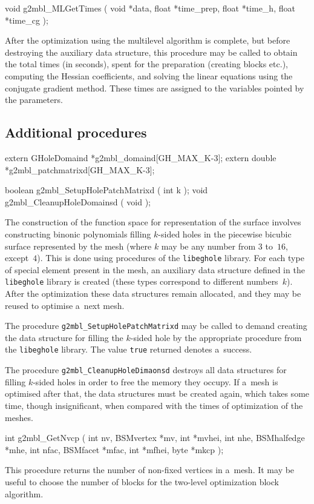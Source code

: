 \medskip
\begin{listingC}
void g2mbl_MLGetTimes ( void *data,
                float *time_prep, float *time_h, float *time_cg );
\end{listingC}
After the optimization using the multilevel algorithm is complete, but
before destroying the auxiliary data structure, this procedure may be called
to obtain the total times (in seconds), spent for the preparation (creating
blocks etc.), computing the Hessian coefficients, and solving the linear
equations using the conjugate gradient method. These times are assigned to
the variables pointed by the parameters.


\subsection{Additional procedures}

\begin{listingC}
extern GHoleDomaind *g2mbl_domaind[GH_MAX_K-3];
extern double *g2mbl_patchmatrixd[GH_MAX_K-3]; 

boolean g2mbl_SetupHolePatchMatrixd ( int k );
void g2mbl_CleanupHoleDomainsd ( void );
\end{listingC}
The construction of the function space for representation of the surface
involves constructing binonic polynomials filling $k$-sided holes in the
piecewise bicubic surface represented by the mesh (where $k$ may be any
number from $3$ to~$16$, except~$4$). This is done using
procedures of the \texttt{libeghole} library. For each type of special
element present in the mesh, an auxiliary data structure defined in the
\texttt{libeghole} library is created (these types correspond to different
numbers~$k$). After the optimization these data structures remain allocated,
and they may be reused to optimise a~next mesh.

The procedure \texttt{g2mbl\_SetupHolePatchMatrixd} may be called to demand
creating the data structure for filling the $k$-sided hole by the
appropriate procedure from the \texttt{libeghole} library.
The value \texttt{true} returned denotes a~success.

The procedure \texttt{g2mbl\_CleanupHoleDimaonsd} destroys all data
structures for filling $k$-sided holes in order to free the memory they
occupy. If a~mesh is optimised after that, the data structures must be
created again, which takes some time, though insignificant, when compared
with the times of optimization of the meshes.

\medskip
\begin{listingC}
int g2mbl_GetNvcp ( int nv, BSMvertex *mv, int *mvhei,
                    int nhe, BSMhalfedge *mhe,
                    int nfac, BSMfacet *mfac, int *mfhei,
                    byte *mkcp );
\end{listingC}
This procedure returns the number of non-fixed vertices in a~mesh. It may be
useful to choose the number of blocks for the two-level optimization block
algorithm.


